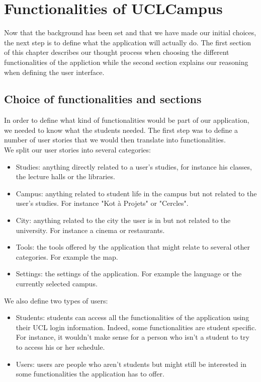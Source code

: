 \documentclass{eplmastersthesis}
\begin{document}
\chapter{Functionalities of UCLCampus}

Now that the background has been set and that we have made our initial choices, the next step is to define what the application will actually do. The first section of this chapter describes our thought process when choosing the different functionalities of the appliction while the second section explains our reasoning when defining the user interface.

\section{Choice of functionalities and sections}


In order to define what kind of functionalities would be part of our application, we needed to know what the students needed. The first step was to define a number of user stories that we would then translate into functionalities.\\ 
We split our user stories into several categories:

\begin{itemize}

\item Studies: anything directly related to a user's studies, for instance his classes, the lecture halls or the libraries.
\item Campus: anything related to student life in the campus but not related to the user's studies. For instance "Kot à Projets" or "Cercles".
\item City: anything related to the city the user is in but not related to the university. For instance a cinema or restaurants.
\item Tools: the tools offered by the application that might relate to several other categories. For example the map.
\item Settings: the settings of the application. For example the language or the currently selected campus.

\end{itemize}

We also define two types of users:

\begin{itemize}

\item Students: students can access all the functionalities of the application using their UCL login information. Indeed, some functionalities are student specific. For instance, it wouldn't make sense for a person who isn't a student to try to access his or her schedule.

\item Users: users are people who aren't students but might still be interested in some functionalities the application has to offer. 

\end{itemize}
\end{document}
